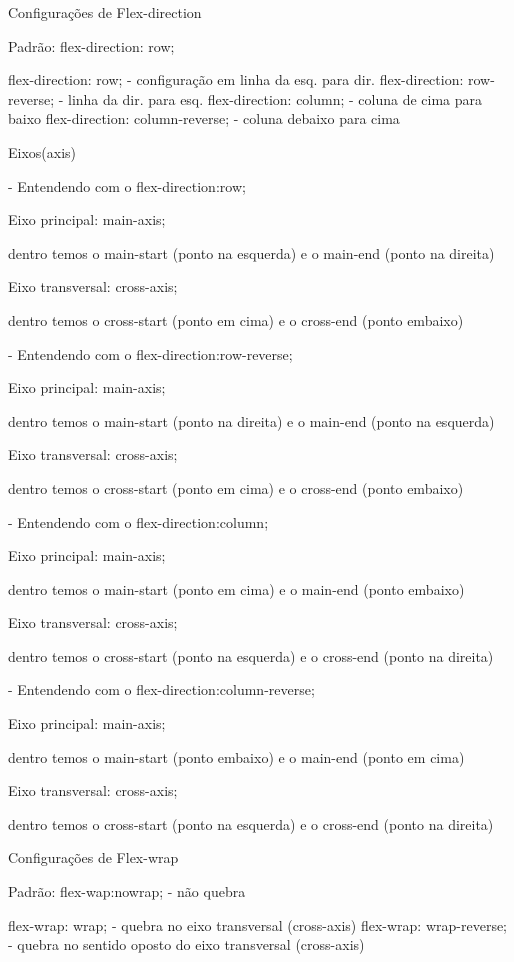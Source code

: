 Configurações de Flex-direction

Padrão: flex-direction: row;

flex-direction: row; - configuração em linha da esq. para dir.
flex-direction: row-reverse; - linha da dir. para esq.
flex-direction: column; - coluna de cima para baixo
flex-direction: column-reverse; - coluna debaixo para cima

Eixos(axis)

- Entendendo com o flex-direction:row;

Eixo principal: main-axis;

dentro temos o main-start (ponto na esquerda) e o main-end (ponto na direita)

Eixo transversal: cross-axis; 

dentro temos o cross-start (ponto em cima) e o cross-end (ponto embaixo)

- Entendendo com o flex-direction:row-reverse;

Eixo principal: main-axis;

dentro temos o main-start (ponto na direita) e o main-end (ponto na esquerda)

Eixo transversal: cross-axis; 

dentro temos o cross-start (ponto em cima) e o cross-end (ponto embaixo)


- Entendendo com o flex-direction:column;

Eixo principal: main-axis;

dentro temos o main-start (ponto em cima) e o main-end (ponto embaixo)

Eixo transversal: cross-axis; 

dentro temos o cross-start (ponto na esquerda) e o cross-end (ponto na direita)


- Entendendo com o flex-direction:column-reverse;

Eixo principal: main-axis;

dentro temos o main-start (ponto embaixo) e o main-end (ponto em cima)

Eixo transversal: cross-axis; 

dentro temos o cross-start (ponto na esquerda) e o cross-end (ponto na direita)


Configurações de Flex-wrap

Padrão: flex-wap:nowrap; - não quebra

flex-wrap: wrap; - quebra no eixo transversal (cross-axis)
flex-wrap: wrap-reverse; - quebra no sentido oposto do eixo transversal (cross-axis)
